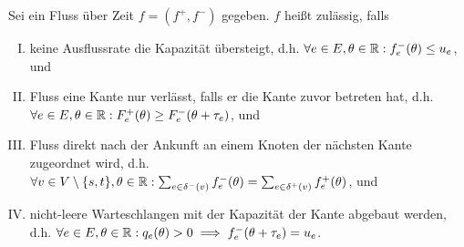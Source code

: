 \begin{definition}
	Sei ein Fluss über Zeit $f=(f^+, f^-)$ gegeben. $f$ heißt zulässig, falls
	\begin{enumerate}[(I)]
		\item\label{def-feasible-flow-capacity} keine Ausflussrate die Kapazität übersteigt, d.h. $\forall e\in E, \theta\in\mathbb{R}: f_e^-(\theta)\leq u_e$, und
		\item\label{weak} Fluss eine Kante nur verlässt, falls er die Kante zuvor betreten hat, d.h. $\forall e\in E, \theta\in\mathbb{R}: F_e^+(\theta) \geq F_e^-(\theta + \tau_e)$, und
		\item\label{def-feasible-flow-no-flow-at-node} Fluss direkt nach der Ankunft an einem Knoten der nächsten Kante zugeordnet wird, d.h. $\forall v\in V\setminus \{ s, t \}, \theta\in\mathbb{R}: \sum_{e\in\delta^-(v)}f^-_e(\theta) = \sum_{e\in\delta^+(v)} f_e^+(\theta)$, und
		\item\label{def-feasible-flow-queue-with-capacity} nicht-leere Warteschlangen mit der Kapazität der Kante abgebaut werden, d.h. $\forall e\in E, \theta\in\mathbb{R}: q_e(\theta) > 0 \implies f_e^-(\theta + \tau_e) = u_e$.
	\end{enumerate}
\end{definition}




